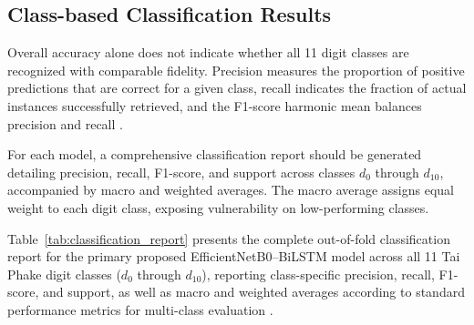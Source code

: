 \documentclass[journal]{IEEEtran}
\begin{document}
\subsection{Class-based Classification Results}

Overall accuracy alone does not indicate whether all 11 digit classes are recognized with comparable fidelity. Precision measures the proportion of positive predictions that are correct for a given class, recall indicates the fraction of actual instances successfully retrieved, and the F1-score harmonic mean balances precision and recall \cite{sokolova2009systematic}.

For each model, a comprehensive classification report should be generated detailing precision, recall, F1-score, and support across classes $d_0$ through $d_{10}$, accompanied by macro and weighted averages. The macro average assigns equal weight to each digit class, exposing vulnerability on low-performing classes.

Table~\ref{tab:classification_report} presents the complete out-of-fold classification report for the primary proposed EfficientNetB0--BiLSTM model across all 11 Tai Phake digit classes ($d_0$ through $d_{10}$), reporting class-specific precision, recall, F1-score, and support, as well as macro and weighted averages according to standard performance metrics for multi-class evaluation \cite{sokolova2009systematic}.
\end{document}
